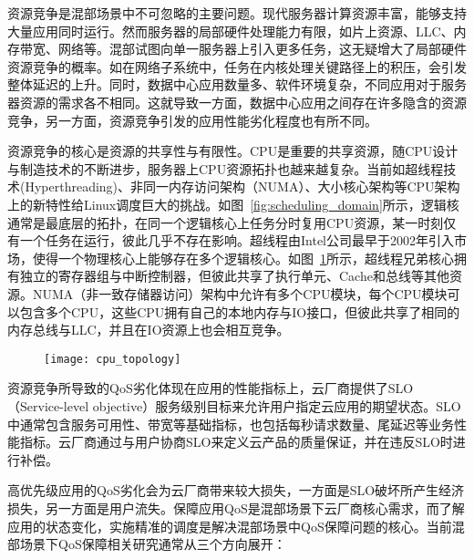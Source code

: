 资源竞争是混部场景中不可忽略的主要问题。现代服务器计算资源丰富，能够支持大量应用同时运行。然而服务器的局部硬件处理能力有限，如片上资源、LLC、内存带宽、网络等。混部试图向单一服务器上引入更多任务，这无疑增大了局部硬件资源竞争的概率。如在网络子系统中，任务在内核处理关键路径上的积压，会引发整体延迟的上升。同时，数据中心应用数量多、软件环境复杂，不同应用对于服务器资源的需求各不相同。这就导致一方面，数据中心应用之间存在许多隐含的资源竞争，另一方面，资源竞争引发的应用性能劣化程度也有所不同。

资源竞争的核心是资源的共享性与有限性。CPU是重要的共享资源，随CPU设计与制造技术的不断进步，服务器上CPU资源拓扑也越来越复杂。当前如超线程技术(Hyperthreading)、非同一内存访问架构（NUMA）、大小核心架构等CPU架构上的新特性给Linux调度巨大的挑战。如图~\ref{fig:scheduling_domain}所示，逻辑核通常是最底层的拓扑，在同一个逻辑核心上任务分时复用CPU资源，某一时刻仅有一个任务在运行，彼此几乎不存在影响。超线程由Intel公司最早于2002年引入市场，使得一个物理核心上能够存在多个逻辑核心。如图~\ref{fig:cpu_topology}所示，超线程兄弟核心拥有独立的寄存器组与中断控制器，但彼此共享了执行单元、Cache和总线等其他资源。NUMA（非一致存储器访问）架构中允许有多个CPU模块，每个CPU模块可以包含多个CPU，这些CPU拥有自己的本地内存与IO接口，但彼此共享了相同的内存总线与LLC，并且在IO资源上也会相互竞争。

\begin{figure}[!htbp]
    \centering
    \texttt{[image: cpu\_topology]}
    \label{fig:cpu_topology}
\end{figure}

资源竞争所导致的QoS劣化体现在应用的性能指标上，云厂商提供了SLO（Service-level objective）服务级别目标来允许用户指定云应用的期望状态。SLO中通常包含服务可用性、带宽等基础指标，也包括每秒请求数量、尾延迟等业务性能指标。云厂商通过与用户协商SLO来定义云产品的质量保证，并在违反SLO时进行补偿。

高优先级应用的QoS劣化会为云厂商带来较大损失，一方面是SLO破坏所产生经济损失，另一方面是用户流失。保障应用QoS是混部场景下云厂商核心需求，而了解应用的状态变化，实施精准的调度是解决混部场景中QoS保障问题的核心。当前混部场景下QoS保障相关研究通常从三个方向展开：

